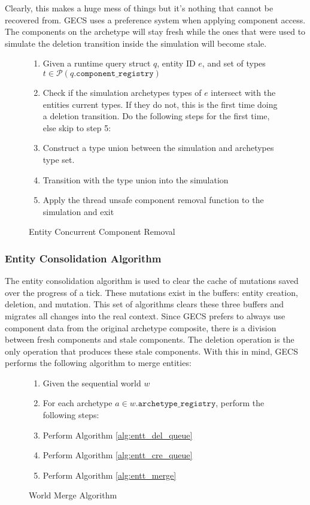Clearly, this makes a huge mess of things but it's nothing that cannot be recovered from. GECS uses a preference system when applying component access. The components on the archetype will stay fresh while the ones that were used to simulate the deletion transition inside the simulation will become stale. 

\begin{figure}[htbp]
    \begin{enumerate}
        \item Given a runtime query struct $q$, entity ID $e$, and set of types $t \in \mathcal{P}(q.\texttt{component\_registry})$
        \item Check if the simulation archetypes types of $e$ intersect with the entities current types. If they do not, this is the first time doing a deletion transition. Do the following steps for the first time, else skip to step 5:
        \item Construct a type union between the simulation and archetypes type set. 
        \item Transition with the type union into the simulation
        \item Apply the thread unsafe component removal function to the simulation and exit
\end{enumerate}
\caption{Entity Concurrent Component Removal}
\label{alg:conc_rem}
\end{figure}

\subsubsection{Entity Consolidation Algorithm}

The entity consolidation algorithm is used to clear the cache of mutations saved over the progress of a tick. These mutations exist in the buffers: entity creation, deletion, and mutation. This set of algorithms clears these three buffers and migrates all changes into the real context. Since GECS prefers to always use component data from the original archetype composite, there is a division between fresh components and stale components. The deletion operation is the only operation that produces these stale components. With this in mind, GECS performs the following algorithm to merge entities:

\begin{figure}[H]
    \begin{enumerate}
        \item Given the sequential world $w$
        \item For each archetype $a \in w.\texttt{archetype\_registry}$, perform the following steps:
        \item Perform Algorithm \ref{alg:entt_del_queue}
        \item Perform Algorithm \ref{alg:entt_cre_queue}
        \item Perform Algorithm \ref{alg:entt_merge}
\end{enumerate}
\caption{World Merge Algorithm}
\label{alg:world_merge}
\end{figure}

